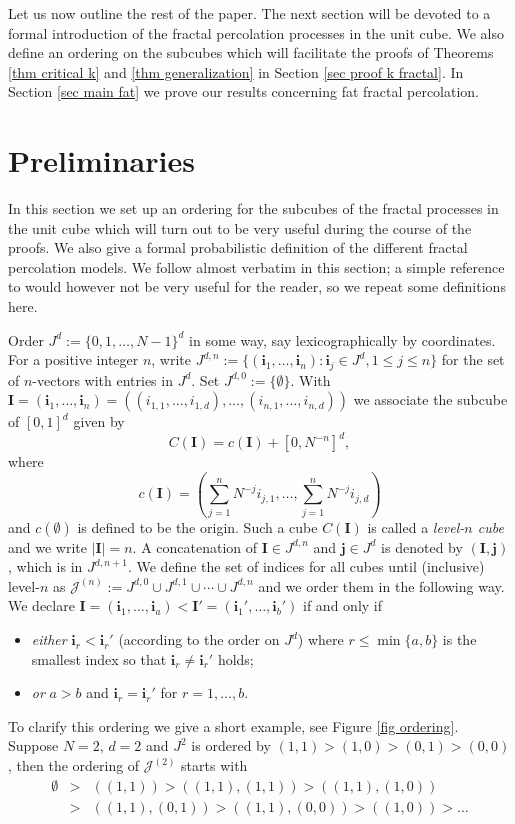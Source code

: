 \documentclass[11pt,a4paper]{article}
\newcommand{\Ib}{\ensuremath{\mathbf{I}}}
\newcommand{\Ii}{\ensuremath{\mathbf{i}}}
\newcommand{\Ij}{\ensuremath{\mathbf{j}}}
\newcommand{\JJ}{\ensuremath{\mathcal{J}}}
\theoremstyle{remark}
\begin{document}
Let us now outline the rest of the paper. The next section will be devoted to a formal introduction of the fractal percolation processes in the unit cube. We also define an ordering on the subcubes which will facilitate the proofs of Theorems \ref{thm critical k} and \ref{thm generalization} in Section \ref{sec proof k fractal}. In Section \ref{sec main fat} we prove our results concerning fat fractal percolation.


\section{Preliminaries}\label{sec pre}

In this section we set up an ordering for the subcubes of the fractal processes in the unit cube which will turn out to be very useful during the course of the proofs. We also give a formal probabilistic definition of the different fractal percolation models.
We follow \cite{FalGri} almost verbatim in this section; a simple reference to \cite{FalGri} would however not be very useful for the reader, so we repeat some definitions here. 


Order $J^d:=\{0,1,\ldots,N-1\}^d$ in some way, say lexicographically by coordinates. For a positive integer $n$, write $J^{d,n}:=\{(\Ii_1,\ldots,\Ii_n): \Ii_j \in J^d, 1 \leq j \leq n \}$ for the set of $n$-vectors with entries in $J^d$. Set $J^{d,0} := \{\emptyset\}$. With $\Ib = (\Ii_1,\ldots,\Ii_n) =((i_{1,1},\ldots,i_{1,d}),\ldots,(i_{n,1},\ldots,i_{n,d}))$ we associate the subcube of $[0,1]^d$ given by
\[
 C(\Ib) = c(\Ib) +[0,N^{-n}]^d,
\]
where 
\[
 c(\Ib) = \left(\sum_{j=1}^{n}N^{-j}i_{j,1},\ldots,\sum_{j=1}^{n}N^{-j}i_{j,d}\right)
\]
and $c(\emptyset)$ is defined to be the origin.
Such a cube $C(\Ib)$ is called a \emph{level-$n$ cube} and we write $|\Ib| = n$. A concatenation of $\Ib \in J^{d,n}$ and $\Ij \in J^d$ is denoted by $(\Ib,\Ij)$, which is in $J^{d,n+1}$. We define the set of indices for all cubes until (inclusive) level-$n$ as $\JJ^{(n)}:=J^{d,0} \cup J^{d,1} \cup \cdots \cup J^{d,n}$ and we order them in the following way. We declare $\Ib=(\Ii_1,\ldots,\Ii_a)<\Ib'=(\Ii_1',\ldots,\Ii_b')$ if and only if
\begin{itemize}
 \item \emph{either} $\Ii_r < \Ii_r'$ (according to the order on $J^d$) where $r \leq \min\{a,b\}$ is the smallest index so that $\Ii_r \neq \Ii_r'$ holds;
\item \emph{or} $a>b$ and $\Ii_r = \Ii_r'$ for $r=1,\ldots,b$.
\end{itemize}
To clarify this ordering we give a short example, see Figure \ref{fig ordering}. Suppose $N=2$, $d=2$ and $J^2$ is ordered by $(1,1)>(1,0)>(0,1)>(0,0)$, then the ordering of $\JJ^{(2)}$ starts with
\begin{eqnarray*}
 \emptyset &>& ((1,1))> ((1,1),(1,1))> ((1,1),(1,0)) \\
&>& ((1,1),(0,1)) >((1,1),(0,0)) > ((1,0)) > \ldots
\end{eqnarray*}
\end{document}
